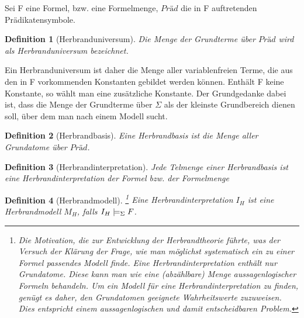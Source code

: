\documentclass[draft]{scrreprt}
\newtheorem{Def}{Definition }[section]
\begin{document}
{Sei F eine Formel, bzw. eine Formelmenge, $ Präd $ die in F auftretenden Prädikatensymbole.
\begin{Def}[Herbranduniversum]
Die Menge der Grundterme über $ Präd $ wird als Herbranduniversum bezeichnet.
\end{Def} 
 Ein Herbranduniversum ist daher die Menge aller variablenfreien Terme, die aus den in F vorkommenden Konstanten gebildet werden können. Enthält F keine Konstante, so wählt man eine zusätzliche Konstante. Der Grundgedanke dabei ist, dass die Menge der Grundterme über $ \Sigma $ als der kleinste Grundbereich dienen soll, über dem man nach einem Modell sucht. 


\begin{Def}[Herbrandbasis] 
Eine Herbrandbasis ist die Menge aller Grundatome über $ Präd $.
\end{Def}


\begin{Def}[Herbrandinterpretation] 
Jede Telmenge einer Herbrandbasis ist eine Herbrandinterpretation der Formel bzw. der Formelmenge
\end{Def}


\begin{Def}[Herbrandmodell] 
\footnote{Die Motivation, die zur Entwicklung der Herbrandtheorie führte, was der Versuch der Klärung der Frage, wie man möglichst systematisch ein zu einer Formel passendes Modell finde. Eine Herbrandinterpretation enthält nur Grundatome. Diese kann man wie eine (abzählbare) Menge aussagenlogischer Formeln behandeln. Um ein Modell für eine Herbrandinterpretation zu finden, genügt es daher, den Grundatomen geeignete Wahrheitswerte zuzuweisen. Dies entspricht einem aussagenlogischen und damit entscheidbaren Problem.}
Eine Herbrandinterpretation $ I_H $ ist eine Herbrandmodell $ M_H $, falls $ I_H \models_{\footnotesize{\Sigma}} F $.
\end{Def}


}
\end{document}
